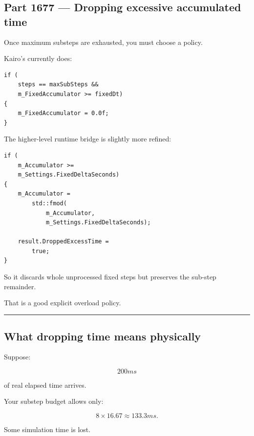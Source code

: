 \subsection{Part 1677 --- Dropping excessive accumulated time}\label{06-engine-ii-ch037-part-1677-dropping-excessive-accumulated-time}

\hypertarget{06-engine-ii-ch037-part-1677-dropping-excessive-accumulated-time}{}

Once maximum substeps are exhausted, you must choose a policy.

Kairo's  currently does:

\begin{verbatim}
if (
    steps == maxSubSteps &&
    m_FixedAccumulator >= fixedDt)
{
    m_FixedAccumulator = 0.0f;
}
\end{verbatim}

The higher-level runtime bridge is slightly more refined:

\begin{verbatim}
if (
    m_Accumulator >=
    m_Settings.FixedDeltaSeconds)
{
    m_Accumulator =
        std::fmod(
            m_Accumulator,
            m_Settings.FixedDeltaSeconds);

    result.DroppedExcessTime =
        true;
}
\end{verbatim}

So it discards whole unprocessed fixed steps but preserves the sub-step remainder.

That is a good explicit overload policy.

\begin{center}\rule{0.5\linewidth}{0.5pt}\end{center}

\subsection{What dropping time means physically}\label{06-engine-ii-ch037-what-dropping-time-means-physically}

\hypertarget{06-engine-ii-ch037-what-dropping-time-means-physically}{}

Suppose:

\[
200ms
\]

of real elapsed time arrives.

Your substep budget allows only:

\[
8\times16.67
\approx133.3ms.
\]

Some simulation time is lost.

